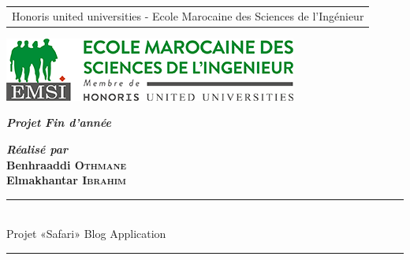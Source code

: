 \documentclass[a4paper, oneside, 12pt, final]{extreport}
\title{\reportSubject}
\author{\reportAuthor}
\newcommand{\reportTitle} {%
  \textsc{Projet de Fin d'\'etudes}
}
\newcommand{\reportAuthor} {%
  Benhraaddi \textsc{Othmane } \\
  Elmakhantar \textsc{Ibrahim }%
}
\newcommand{\reportSubject} {%
 Projet «Safari» Blog Application
}
\newcommand{\dateSoutenance} {%
  12/06/2018%
}
\newcommand{\EMSI} {%
  Ecole Marocaine des Sciences de l'Ing\'enieur
}
\begin{document}
\thispagestyle{empty}
\begin{titlepage}
\begin{center}




{%
  \fontsize{9pt}{9pt}\selectfont%
  \begin{tabular}{c}
    Honoris united universities - \EMSI{} \\
  \end{tabular}
}

\vspace{1cm}

\includegraphics[scale=.5]{EMSI_logo2.png}


\vspace{30pt} {%
  \renewcommand*{\familydefault}{\defaultFont}
  \fontsize{46pt}{46pt}\selectfont%
}


\vspace{10pt}
\textbf{\textit{Projet Fin d'année}}


\vspace{30pt}
\textbf{\textit{Réalisé par}}\\
\vspace{10pt} {%
  \fontsize{18pt}{18pt}\selectfont%
  \textbf{\reportAuthor}\\
}%

\vspace{10pt} {%
  \renewcommand*{\familydefault}{\defaultFont}
  \fontsize{27pt}{27pt}\selectfont%
  \rule{0.5\textwidth}{.4pt}\\
  \vspace{10pt}
  \reportSubject{}\\%
  \vspace{10pt}
  \rule{0.5\textwidth}{.4pt}
}



\end{center}
\end{titlepage}
\end{document}
